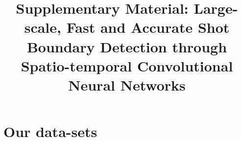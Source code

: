 \documentclass[journal]{IEEEtran}
\begin{document}
\newpage
\title{Supplementary Material: Large-scale, Fast and Accurate Shot Boundary Detection through Spatio-temporal Convolutional Neural Networks}
\maketitle
\setcounter{equation}{0}
\setcounter{figure}{0}
\setcounter{table}{0}
\setcounter{section}{0}
\setcounter{page}{1}
\makeatletter
\renewcommand{\theequation}{\arabic{equation}}
\renewcommand{\thefigure}{\arabic{figure}}





\section{Our data-sets}
\end{document}
